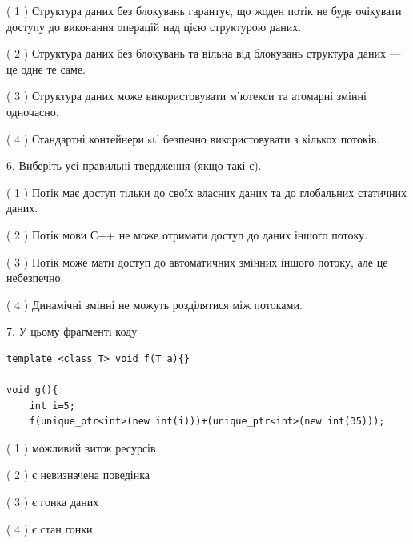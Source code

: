 \documentclass[12pt, ukrainian]{article}
\begin{document}
\begin {large}
{( 1 ) Структура даних без блокувань гарантує, що жоден потік не буде очікувати доступу до виконання операцій над цією структурою даних.%

( 2 ) Структура даних без блокувань та вільна від блокувань структура даних --- це одне те саме.%

( 3 ) Структура даних може використовувати м’ютекси та атомарні змінні одночасно.%

( 4 ) Стандартні контейнери stl безпечно використовувати з кількох потоків.%
\newpage



\vspace{5mm}
6. Виберіть усі правильні твердження (якщо такі є).\par
\vspace{2mm}

( 1 ) Потік має доступ тільки до своїх власних даних та до глобальних статичних даних.%

( 2 ) Потік мови С++ не може отримати доступ до даних іншого потоку.%

( 3 ) Потік може мати доступ до автоматичних змінних іншого потоку, але це небезпечно.%

( 4 ) Динамічні змінні не можуть розділятися між потоками.%


\vspace{5mm}
7. У цьому фрагменті коду
\begin{verbatim}
template <class T> void f(T a){}

void g(){
    int i=5;
    f(unique_ptr<int>(new int(i)))+(unique_ptr<int>(new int(35)));
\end{verbatim}
( 1 ) можливий виток ресурсів%

( 2 ) є невизначена поведінка%

( 3 ) є гонка даних%

( 4 ) є стан гонки%
}
\end {large}
\end{document}
